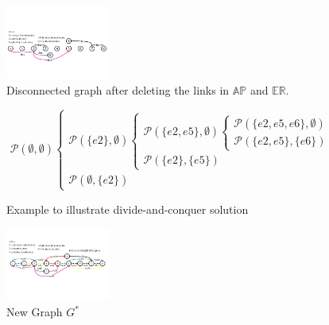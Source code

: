 \begin{figure}
  \centering
  \includegraphics[width=1.35in]{franz/DeletePathGraph}
  \caption{Disconnected graph after deleting the links in $\mathbb{AP}$ and ${\mathbb{ER}}$.}
  \label{fig:DeletePathGraph}
\end{figure}
\begin{figure}
\tiny{
\begin{equation*}
{\mathcal P}(\emptyset ,\emptyset )\left\{ {\begin{array}{*{20}{l}}
{{\mathcal P}(\{ e2\} ,\emptyset )\left\{ {\begin{array}{*{20}{l}}
{{\mathcal P}(\{ e2,e5\} ,\emptyset )\left\{ {\begin{array}{*{20}{l}}
{{\mathcal P}(\{ e2,e5,e6\} ,\emptyset )}\\
{\boxed{{\mathcal P}(\{ e2,e5\} ,\{ e6\} )}}
\end{array}} \right.}\\
{\boxed{{\mathcal P}(\{ e2\} ,\{ e5\} )}}
\end{array}} \right.}\\
{\boxed{{\mathcal P}(\emptyset ,\{ e2\} )}}
\end{array}} \right.
\end{equation*}
}
\caption{Example to illustrate divide-and-conquer solution}
\label{fig:DividedConquer}
\end{figure}
\begin{figure}[tp]
  \centering
  \includegraphics[width=1.35in]{franz/FlowStarGraph}
  \caption{New Graph $G^*$}\label{fig:FlowStarGraph}
\end{figure}

